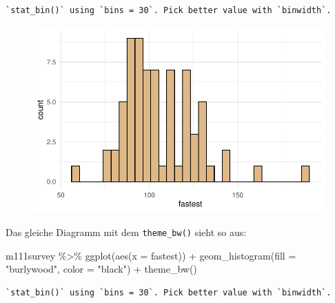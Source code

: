 \documentclass[
  letterpaper,
  DIV=11,
  numbers=noendperiod]{scrartcl}
\newenvironment{Shaded}{\begin{snugshade}}{\end{snugshade}}
\newcommand{\AttributeTok}[1]{\textcolor[rgb]{0.40,0.45,0.13}{#1}}
\newcommand{\FunctionTok}[1]{\textcolor[rgb]{0.28,0.35,0.67}{#1}}
\newcommand{\NormalTok}[1]{\textcolor[rgb]{0.00,0.23,0.31}{#1}}
\newcommand{\SpecialCharTok}[1]{\textcolor[rgb]{0.37,0.37,0.37}{#1}}
\newcommand{\StringTok}[1]{\textcolor[rgb]{0.13,0.47,0.30}{#1}}
\begin{document}
\begin{verbatim}
`stat_bin()` using `bins = 30`. Pick better value with `binwidth`.
\end{verbatim}

\begin{figure}[H]

{\centering \includegraphics{05-visualisierung_files/figure-pdf/unnamed-chunk-9-1.pdf}

}

\end{figure}

Das gleiche Diagramm mit dem \texttt{theme\_bw()} sieht so aus:

\begin{Shaded}
\begin{Highlighting}[]
\NormalTok{m111survey }\SpecialCharTok{\%\textgreater{}\%} 
  \FunctionTok{ggplot}\NormalTok{(}\FunctionTok{aes}\NormalTok{(}\AttributeTok{x =}\NormalTok{ fastest)) }\SpecialCharTok{+}
  \FunctionTok{geom\_histogram}\NormalTok{(}\AttributeTok{fill =} \StringTok{"burlywood"}\NormalTok{, }\AttributeTok{color =} \StringTok{"black"}\NormalTok{) }\SpecialCharTok{+}
  \FunctionTok{theme\_bw}\NormalTok{()}
\end{Highlighting}
\end{Shaded}

\begin{verbatim}
`stat_bin()` using `bins = 30`. Pick better value with `binwidth`.
\end{verbatim}
\end{document}

